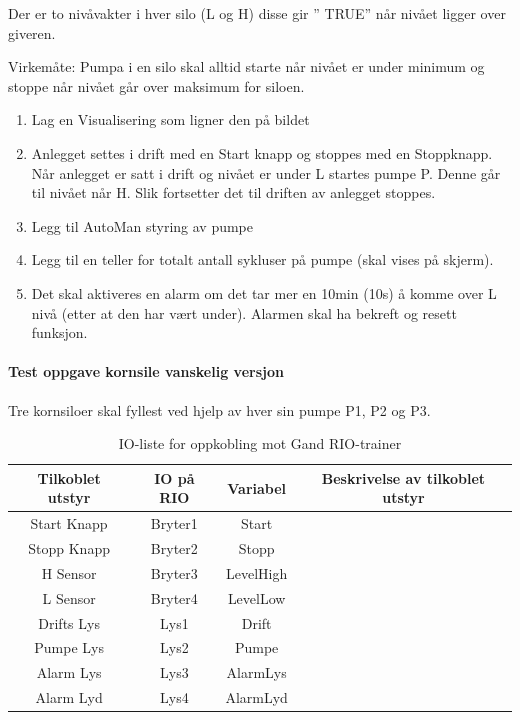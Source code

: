 \documentclass[12pt,a4paper]{article}
\begin{document}
Der er to nivåvakter i hver silo (L og H) disse gir \textquotedblright{}
TRUE\textquotedblright{} når nivået ligger over giveren.

Virkemåte: Pumpa i en silo skal alltid starte når nivået er under
minimum og stoppe når nivået går over maksimum for siloen.
\begin{enumerate}
\item Lag en Visualisering som ligner den på bildet
\item Anlegget settes i drift med en Start knapp og stoppes med en Stoppknapp.
Når anlegget er satt i drift og nivået er under L startes pumpe P.
Denne går til nivået når H. Slik fortsetter det til driften av anlegget
stoppes.
\item Legg til AutoMan styring av pumpe
\item Legg til en teller for totalt antall sykluser på pumpe (skal vises
på skjerm). 
\item Det skal aktiveres en alarm om det tar mer en 10min (10s) å komme
over L nivå (etter at den har vært under). Alarmen skal ha bekreft
og resett funksjon.
\end{enumerate}

\paragraph{Test oppgave kornsile vanskelig versjon}

Tre kornsiloer skal fyllest ved hjelp av hver sin pumpe P1, P2 og
P3. 

\begin{table}[]
\begin{centering}
\begin{tabular}{|c|c|c|c|}
\hline 
Tilkoblet utstyr & IO på RIO & Variabel & Beskrivelse av tilkoblet utstyr\tabularnewline
\hline 
\hline 
Start Knapp & Bryter1 & Start & \tabularnewline
\hline 
Stopp Knapp & Bryter2 & Stopp & \tabularnewline
\hline 
H Sensor & Bryter3 & LevelHigh & \tabularnewline
\hline 
L Sensor & Bryter4 & LevelLow & \tabularnewline
\hline 
Drifts Lys & Lys1 & Drift & \tabularnewline
\hline 
Pumpe Lys & Lys2 & Pumpe & \tabularnewline
\hline 
Alarm Lys & Lys3 & AlarmLys & \tabularnewline
\hline 
Alarm Lyd & Lys4 & AlarmLyd & \tabularnewline
\hline 
\end{tabular}
\par\end{centering}
\caption{IO-liste for oppkobling mot Gand RIO-trainer}
\end{table}
\end{document}
